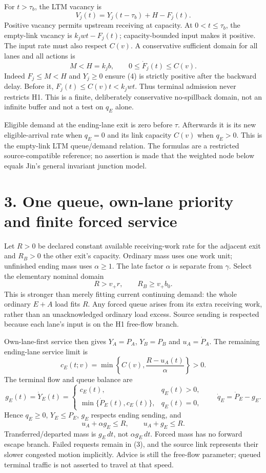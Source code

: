\documentclass[11pt,a4paper]{article}
\begin{document}
For $t>\tau_b$, the LTM vacancy is
\[
 V_j(t)=Y_j(t-\tau_b)+H-F_j(t).
 \tag{4}
\]
Positive vacancy permits upstream receiving at capacity. At $0<t\leq\tau_b$,
the empty-link vacancy is $k_jwt-F_j(t)$; capacity-bounded input makes it
positive. The input rate must also respect $C(v)$. A conservative sufficient
domain for all lanes and all actions is
\[
 M<H=k_jb,\qquad 0\leq\dot F_j(t)\leq C(v).
 \tag{5}
\]
Indeed $F_j\leq M<H$ and $Y_j\geq0$ ensure (4) is strictly positive after
the backward delay. Before it, $F_j(t)\leq C(v)t<k_jwt$. Thus terminal
admission never restricts H1. This is a finite, deliberately conservative
no-spillback domain, not an infinite buffer and not a test on $q_E$ alone.

Eligible demand at the ending-lane exit is zero before $\tau$. Afterwards it
is its new eligible-arrival rate when $q_E=0$ and its link capacity $C(v)$
when $q_E>0$. This is the empty-link LTM queue/demand relation. The formulas
are a restricted source-compatible reference; no assertion is made that
the weighted node below equals Jin's general invariant junction model.

\section*{3. One queue, own-lane priority and finite forced service}
Let $R>0$ be declared constant available receiving-work rate for the adjacent
exit and $R_B>0$ the other exit's capacity. Ordinary mass uses one work unit;
unfinished ending mass uses $\alpha\geq1$. The late factor $\alpha$ is separate
from $\gamma$. Select the elementary nominal domain
\[
 R>v_+r,\qquad R_B\geq v_+b_0.
 \tag{6}
\]
This is stronger than merely fitting current continuing demand: the whole
ordinary $E+A$ load fits $R$. Any forced queue arises from its extra receiving
work, rather than an unacknowledged ordinary load excess. Source sending is
respected because each lane's input is on the H1 free-flow branch.

Own-lane-first service then gives $Y_A=P_A$, $Y_B=P_B$ and
$u_A=\dot P_A$. The remaining ending-lane service limit is
\[
 c_E(t;v)=\min\left\{C(v),\frac{R-u_A(t)}{\alpha}\right\}>0.
 \tag{7}
\]
The terminal flow and queue balance are
\[
 g_E(t)=\dot Y_E(t)=
 \begin{cases}
 c_E(t),&q_E(t)>0,\\
 \min\{\dot P_E(t),c_E(t)\},&q_E(t)=0,
 \end{cases}
 \qquad \dot q_E=\dot P_E-g_E.
 \tag{8}
\]
Hence $q_E\geq0$, $Y_E\leq P_E$, $g_E$ respects ending sending, and
\[
 u_A+\alpha g_E\leq R,\qquad
 u_A+g_E\leq R.
 \tag{9}
\]
Transferred/departed mass is $g_E\,dt$, not $\alpha g_E\,dt$. Forced mass
has no forward escape branch. Failed requests remain in (3), and the source
link represents their slower congested motion implicitly. Advice is still
the free-flow parameter; queued terminal traffic is not asserted to travel
at that speed.
\end{document}
